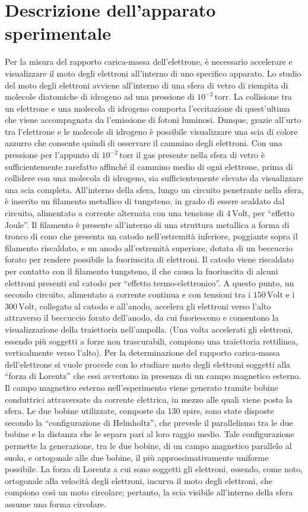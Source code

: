 \documentclass[a4paper,12pt]{article}
\begin{document}
\section{Descrizione dell’apparato sperimentale}
Per la misura del rapporto carica-massa dell’elettrone, è necessario accelerare e visualizzare il moto degli elettroni all’interno di uno specifico apparato. 
Lo studio del moto degli elettroni avviene all’interno di una sfera di vetro di riempita di molecole diatomiche di idrogeno ad una pressione di \(10^{-2} \, \text{torr}\). La collisione tra un elettrone e una molecola di idrogeno comporta l’eccitazione di quest’ultima che viene accompagnata da l’emissione di fotoni luminosi. Dunque, grazie all’urto tra l’elettrone e le molecole di idrogeno è possibile visualizzare una scia di colore azzurro che consente quindi di osservare il cammino degli elettroni. Con una pressione per l’appunto di \(10^{-2} \, \text{torr}\) il gas presente nella sfera di vetro è sufficientemente rarefatto affinché il cammino medio di ogni elettrone, prima di collidere con una molecola di idrogeno, sia sufficientemente elevato da visualizzare una scia completa. All’interno della sfera, lungo un circuito penetrante nella sfera, è inserito un filamento metallico di tungsteno, in grado di essere scaldato dal circuito, alimentato a corrente alternata con una tensione di \(4 \, \text{Volt}\), per “effetto Joule”. Il filamento è presente all’interno di una struttura metallica a forma di tronco di cono che presenta un catodo nell’estremità inferiore, poggiante sopra il filamento riscaldato, e un anodo all’estremità superiore, dotata di un beccuccio forato per rendere possibile la fuoriuscita di elettroni. Il catodo viene riscaldato per contatto con il filamento tungsteno, il che causa la fuoriuscita di alcuni elettroni presenti sul catodo per “effetto termo-elettronico”. A questo punto, un secondo circuito, alimentato a corrente continua e con tensioni tra i \(150 \, \text{Volt}\) e i \(300 \, \text{Volt}\), collegato al catodo e all’anodo, accelera gli elettroni verso l’alto attraverso il beccuccio forato dell’anodo, da cui fuoriescono e consentono la visualizzazione della traiettoria nell’ampolla. (Una volta accelerati gli elettroni, essendo più soggetti a forze non trascurabili, compiono una traiettoria rettilinea, verticalmente verso l’alto). Per la determinazione del rapporto carica-massa dell’elettrone si vuole procede con lo studiare moto degli elettroni soggetti alla “forza di Lorentz” che essi avvertono in presenza di un campo magnetico esterno. Il campo magnetico esterno nell’esperimento viene generato tramite bobine conduttrici attraversate da corrente elettrica, in mezzo alle quali viene posta la sfera. Le due bobine utilizzate, composte da 130 spire, sono state disposte secondo la “configurazione di Helmholtz”, che prevede il parallelismo tra le due bobine e la distanza che le separa pari al loro raggio medio. Tale configurazione permette la generazione, tra le due bobine, di un campo magnetico parallelo al suolo, e ortogonale alle due bobine, il più approssimativamente uniforme possibile. La forza di Lorentz a cui sono soggetti gli elettroni, essendo, come noto, ortogonale alla velocità degli elettroni, incurva il moto degli elettroni, che compiono così un moto circolare; pertanto, la scia visibile all’interno della sfera assume una forma circolare. 
\end{document}
